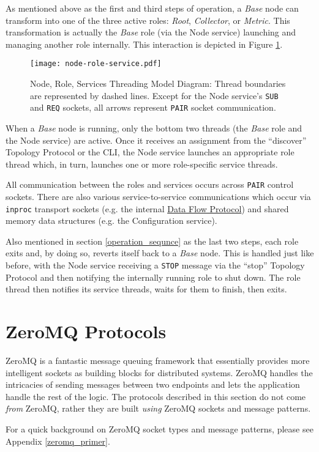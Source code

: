 As mentioned above as the first and third steps of \dcamp operation, a \textit{Base} node can transform into one of the
three active \dcamp roles: \textit{Root}, \textit{Collector}, or \textit{Metric}. This transformation is actually the
\textit{Base} role (via the Node service) launching and managing another role internally. This interaction is depicted
in Figure \ref{fig:node_role_service_image}.

\begin{figure}[H]
    \centering
    \texttt{[image: node-role-service.pdf]}
    \caption[Node, Role, Services Threading Model Diagram]
            {Node, Role, Services Threading Model Diagram: Thread boundaries are represented by dashed lines. Except for
	     the Node service's \texttt{SUB} and \texttt{REQ} sockets, all arrows represent \texttt{PAIR} socket
	     communication.}
    \label{fig:node_role_service_image}
\end{figure}

When a \textit{Base} node is running, only the bottom two threads (the \textit{Base} role and the Node service) are
active. Once it receives an assignment from the ``discover'' Topology Protocol or the \dcamp CLI, the Node service
launches an appropriate role thread which, in turn, launches one or more role-specific service threads.

All communication between the roles and services occurs across \texttt{PAIR} control sockets. There are also various
service-to-service communications which occur via \texttt{inproc} transport sockets (e.g. the internal
\hyperref[proto_data]{Data Flow Protocol}) and shared memory data structures (e.g. the Configuration service).

Also mentioned in section \ref{operation_sequnce} as the last two steps, each role exits and, by doing so, reverts
itself back to a \textit{Base} node. This is handled just like before, with the Node service receiving a \texttt{STOP}
message via the ``stop'' Topology Protocol and then notifying the internally running role to shut down. The role thread
then notifies its service threads, waits for them to finish, then exits.

\section{ZeroMQ Protocols}

ZeroMQ is a fantastic message queuing framework that essentially provides more intelligent sockets as building blocks
for distributed systems. ZeroMQ handles the intricacies of sending messages between two endpoints and lets the
application handle the rest of the logic. The protocols described in this section do not come \textit{from} ZeroMQ,
rather they are built \textit{using} ZeroMQ sockets and message patterns.

For a quick background on ZeroMQ socket types and message patterns, please see Appendix \ref{zeromq_primer}.






